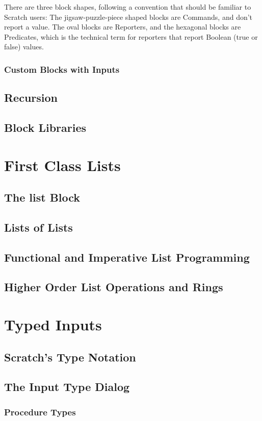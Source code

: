 \documentclass{report}
\begin{document}
There are three block shapes, following a convention that should be familiar to Scratch users: The jigsaw-puzzle-piece shaped blocks are Commands, and don't report a value. The oval blocks are Reporters, and the hexagonal blocks are Predicates, which is the technical term for reporters that report Boolean (true or false) values.

\subsection{Custom Blocks with Inputs}
\section{Recursion}
\section{Block Libraries}
\chapter{First Class Lists}
\section{The list Block}
\section{Lists of Lists}
\section{Functional and Imperative List Programming}
\section{Higher Order List Operations and Rings}
\chapter{Typed Inputs}
\section{Scratch's Type Notation}
\section{The \Snap{} Input Type Dialog}
\subsection{Procedure Types}
\end{document}
